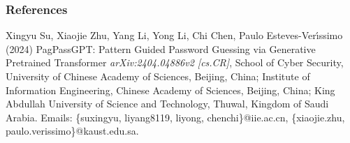 \documentclass[
	12pt, %
]{beamer}
\begin{document}
%	
%	
%	
%	



\begin{frame} %
	\frametitle{References}
	
	\begin{thebibliography}{99} %
		\footnotesize %
		
		Xingyu Su, Xiaojie Zhu, Yang Li, Yong Li, Chi Chen, Paulo Esteves-Verı́ssimo (2024)
		\newblock PagPassGPT: Pattern Guided Password Guessing via Generative Pretrained Transformer
		\newblock \emph{arXiv:2404.04886v2 [cs.CR]}, School of Cyber Security, University of Chinese Academy of Sciences, Beijing, China; Institute of Information Engineering, Chinese Academy of Sciences, Beijing, China; King Abdullah University of Science and Technology, Thuwal, Kingdom of Saudi Arabia.
		\newblock Emails: \{suxingyu, liyang8119, liyong, chenchi\}@iie.ac.cn, \{xiaojie.zhu, paulo.verissimo\}@kaust.edu.sa.
		
		
		
		
	\end{thebibliography}
\end{frame}
\end{document}
